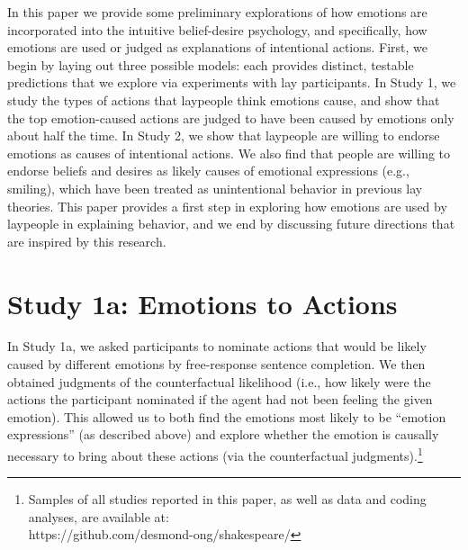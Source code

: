 \documentclass[10pt,letterpaper]{article}
\begin{document}
In this paper we provide some preliminary explorations of how emotions are incorporated into the intuitive belief-desire psychology, and specifically, how emotions are used or judged as explanations of intentional actions. First, we begin by laying out three possible models: each provides distinct, testable predictions that we explore via experiments with lay participants. In Study 1, we study the types of actions that laypeople think emotions cause, and show that the top emotion-caused actions are judged to have been caused by emotions only about half the time. In Study 2, we show that laypeople are willing to endorse emotions as causes of intentional actions. We also find that people are willing to endorse beliefs and desires as likely causes of emotional expressions (e.g., smiling), which have been treated as unintentional behavior in previous lay theories. This paper provides a first step in exploring how emotions are used by laypeople in explaining behavior, and we end by discussing future directions that are inspired by this research.





\section{Study 1a: Emotions to Actions}

	In Study 1a, we asked participants to nominate actions that would be likely caused by different emotions by free-response sentence completion. 
	We then obtained judgments of the counterfactual likelihood (i.e., how likely were the actions the participant nominated if the agent had not been feeling the given emotion). 
	This allowed us to both find the emotions most likely to be ``emotion expressions'' (as described above) and explore whether the emotion is causally necessary to bring about these actions (via the counterfactual judgments).\footnote{Samples of all studies reported in this paper, as well as data and coding analyses, are available at: \\https://github.com/desmond-ong/shakespeare/}
\end{document}
